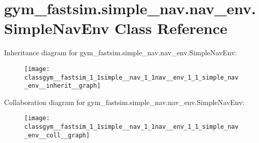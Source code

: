 \hypertarget{classgym__fastsim_1_1simple__nav_1_1nav__env_1_1_simple_nav_env}{}\section{gym\+\_\+fastsim.\+simple\+\_\+nav.\+nav\+\_\+env.\+Simple\+Nav\+Env Class Reference}
\label{classgym__fastsim_1_1simple__nav_1_1nav__env_1_1_simple_nav_env}


Inheritance diagram for gym\+\_\+fastsim.\+simple\+\_\+nav.\+nav\+\_\+env.\+Simple\+Nav\+Env\+:
\nopagebreak
\begin{figure}[H]
\begin{center}
\leavevmode
\texttt{[image: classgym\_\_fastsim\_1\_1simple\_\_nav\_1\_1nav\_\_env\_1\_1\_simple\_nav\_env\_\_inherit\_\_graph]}
\end{center}
\end{figure}


Collaboration diagram for gym\+\_\+fastsim.\+simple\+\_\+nav.\+nav\+\_\+env.\+Simple\+Nav\+Env\+:
\nopagebreak
\begin{figure}[H]
\begin{center}
\leavevmode
\texttt{[image: classgym\_\_fastsim\_1\_1simple\_\_nav\_1\_1nav\_\_env\_1\_1\_simple\_nav\_env\_\_coll\_\_graph]}
\end{center}
\end{figure}
